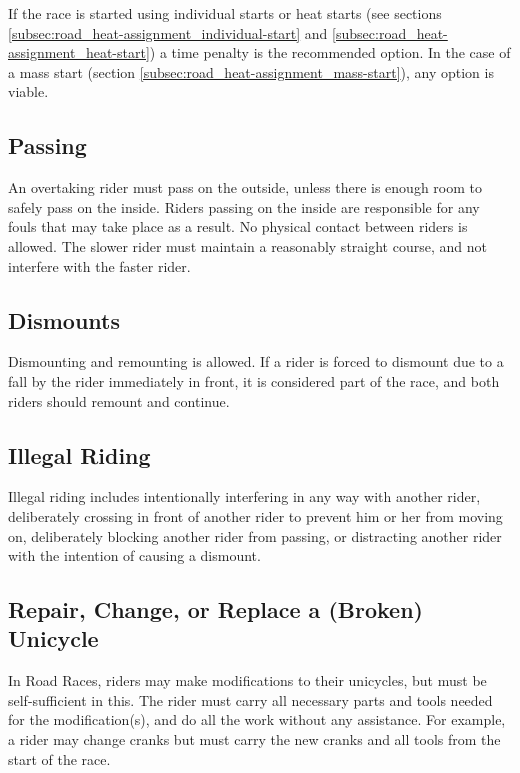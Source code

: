 If the race is started using individual starts or heat starts (see sections \ref{subsec:road_heat-assignment_individual-start} and \ref{subsec:road_heat-assignment_heat-start}) a time penalty is the recommended option.
In the case of a mass start (section \ref{subsec:road_heat-assignment_mass-start}), any option is viable.

\subsection{Passing}

An overtaking rider must pass on the outside, unless there is enough room to safely pass on the inside.
Riders passing on the inside are responsible for any fouls that may take place as a result.
No physical contact between riders is allowed.
The slower rider must maintain a reasonably straight course, and not interfere with the faster rider.

\subsection{Dismounts}

Dismounting and remounting is allowed.
If a rider is forced to dismount due to a fall by the rider immediately in front, it is considered part of the race, and both riders should remount and continue.

\subsection{Illegal Riding}

Illegal riding includes intentionally interfering in any way with another rider, deliberately crossing in front of another rider to prevent him or her from moving on, deliberately blocking another rider from passing, or distracting another rider with the intention of causing a dismount.

\subsection{Repair, Change, or Replace a (Broken) Unicycle \label{subsec:road_unicycle-changes}}
In Road Races, riders may make modifications to their unicycles, but must be self-sufficient in this.
The rider must carry all necessary parts and tools needed for the modification(s), and do all the work without any assistance.
For example, a rider may change cranks but must carry the new cranks and all tools from the start of the race.

